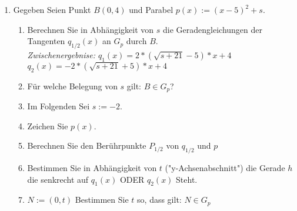 \documentclass{scrartcl}
\begin{document}
		
	\begin{enumerate}
		
		
		\item Gegeben Seien Punkt $B(0,4)$ und Parabel $p(x):=(x-5)^2+s$.
		\begin{enumerate}
			\item Berechnen Sie in Abhängigkeit von $s$ die Geradengleichungen der Tangenten $q_{1/2}(x)$ an $G_p$ durch $B$. \\
				\emph{Zwischenergebnise: $q_1(x) = 2 * (\sqrt{s+21}-5 )*x+4$ \quad $q_2(x) = -2 * (\sqrt{s+21}+5 )*x+4$}
			\item Für welche Belegung von $s$ gilt: $B\in G_p $? 
			\item Im Folgenden Sei $s:=-2$.
			\item Zeichen Sie $p(x)$.

			\item Berechnen Sie den Berührpunkte $P_{1/2}$ von $q_{1/2}$ und $p$
			\item Bestimmen Sie in Abhängigkeit von $t$ ("y-Achsenabschnitt") die Gerade $h$ die senkrecht auf $q_1(x)$ ODER $q_2(x)$ Steht.
			\item $N := (0,t)$ Bestimmen Sie $t$ so, dass gilt: $ N \in G_p$
		\end{enumerate} %
		
		
		
	\end{enumerate} 
	
	
\end{document}

